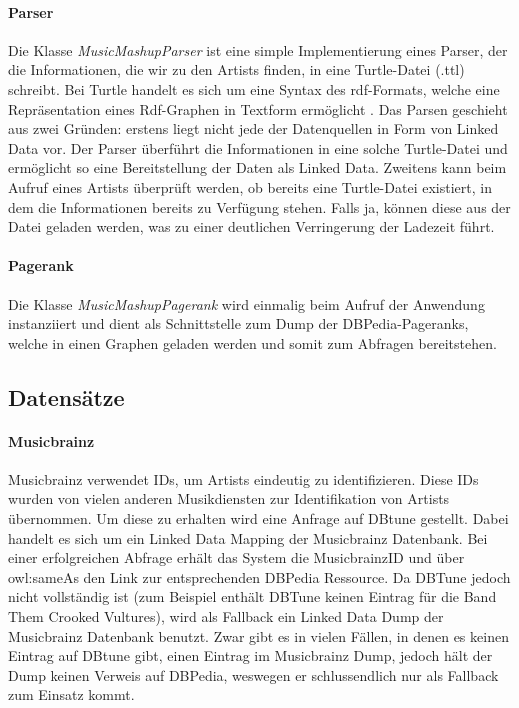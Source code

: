 \paragraph{Parser} Die Klasse \textit{MusicMashupParser} ist eine simple Implementierung eines Parser, der die Informationen, die wir zu den Artists finden, in eine Turtle-Datei (.ttl) schreibt. Bei Turtle handelt es sich um eine Syntax des rdf-Formats, welche eine Repräsentation eines Rdf-Graphen in Textform ermöglicht \cite{turtle}. Das Parsen geschieht aus zwei Gründen: erstens liegt nicht jede der Datenquellen in Form von Linked Data vor. Der Parser überführt die Informationen in eine solche Turtle-Datei und ermöglicht so eine Bereitstellung der Daten als Linked Data.  Zweitens kann beim Aufruf eines Artists überprüft werden, ob bereits eine Turtle-Datei existiert, in dem die Informationen bereits zu Verfügung stehen. Falls ja, können diese aus der Datei geladen werden, was zu einer deutlichen Verringerung der Ladezeit führt.


\paragraph{Pagerank} Die Klasse \textit{MusicMashupPagerank} wird einmalig beim Aufruf der Anwendung instanziiert und dient als Schnittstelle zum Dump der DBPedia-Pageranks, welche in einen Graphen geladen werden und somit zum Abfragen bereitstehen.

\subsection{Datensätze}

\paragraph{Musicbrainz} Musicbrainz verwendet IDs, um Artists eindeutig zu identifizieren. Diese IDs wurden von vielen anderen Musikdiensten zur Identifikation von Artists übernommen. Um diese zu erhalten wird eine Anfrage auf DBtune \cite{dbtune} gestellt. Dabei handelt es sich um ein Linked Data Mapping der Musicbrainz Datenbank. Bei einer erfolgreichen Abfrage erhält das System die MusicbrainzID und über owl:sameAs den Link zur entsprechenden DBPedia Ressource. Da DBTune jedoch nicht vollständig ist (zum Beispiel enthält DBTune keinen Eintrag für die Band \glqq Them Crooked Vultures\grqq), wird als Fallback ein Linked Data Dump der Musicbrainz Datenbank benutzt. Zwar gibt es in vielen Fällen, in denen es keinen Eintrag auf DBtune gibt, einen Eintrag im Musicbrainz Dump, jedoch hält der Dump keinen Verweis auf DBPedia, weswegen er schlussendlich nur als Fallback zum Einsatz kommt.

